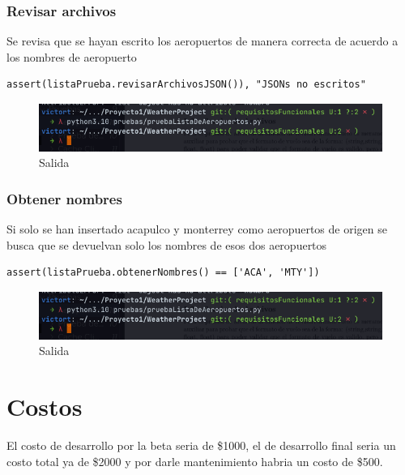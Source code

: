 \documentclass[12pt]{article}
\begin{document}
\subsubsection{Revisar archivos}
Se revisa que se hayan escrito los aeropuertos de manera correcta de acuerdo a los nombres de aeropuerto
\begin{verbatim}
assert(listaPrueba.revisarArchivosJSON()), "JSONs no escritos"
\end{verbatim}
\begin{figure}[h!]
    \centering
    \includegraphics[scale=0.6]{pruebasPy/listaAeropuertos/bien.png}
    \caption{Salida}
  \end{figure}

\subsubsection{Obtener nombres}
Si solo se han insertado acapulco y monterrey como aeropuertos de origen se busca que se devuelvan solo los nombres de esos dos aeropuertos
\begin{verbatim}
assert(listaPrueba.obtenerNombres() == ['ACA', 'MTY'])
\end{verbatim}
\begin{figure}[h!]
    \centering
    \includegraphics[scale=0.6]{pruebasPy/listaAeropuertos/bien.png}
    \caption{Salida}
  \end{figure}

\section{Costos}
El costo de desarrollo por la beta seria de \$1000, el de desarrollo final seria un costo total ya de \$2000 y por darle mantenimiento habria un costo de \$500.
\end{document}
